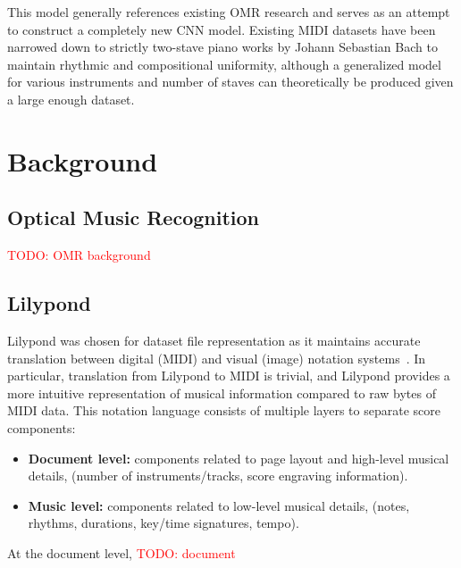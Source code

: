 \documentclass[review,sigconf]{acmart}
\newcommand{\todo}[1]{\textcolor{red}{TODO: #1}}
\begin{document}
This model generally references existing OMR research and serves as an attempt to construct a completely new CNN model. Existing MIDI datasets have been narrowed down to strictly two-stave piano works by Johann Sebastian Bach to maintain rhythmic and compositional uniformity, although a generalized model for various instruments and number of staves can theoretically be produced given a large enough dataset.


\section{Background}
\subsection{Optical Music Recognition}
\todo{OMR background}

\subsection{Lilypond}
Lilypond was chosen for dataset file representation as it maintains accurate translation between digital (MIDI) and visual (image) notation systems~\cite{lilypond}.
In particular, translation from Lilypond to MIDI is trivial, and Lilypond provides a more intuitive representation of musical information compared to raw bytes of MIDI data.
This notation language consists of multiple layers to separate score components:

\begin{itemize}
		\item \textbf{Document level:} components related to page layout and high-level musical details, (number of instruments/tracks, score engraving information).
		\item \textbf{Music level:} components related to low-level musical details, (notes, rhythms, durations, key/time signatures, tempo).
\end{itemize}

At the document level, \todo{document}
\end{document}
